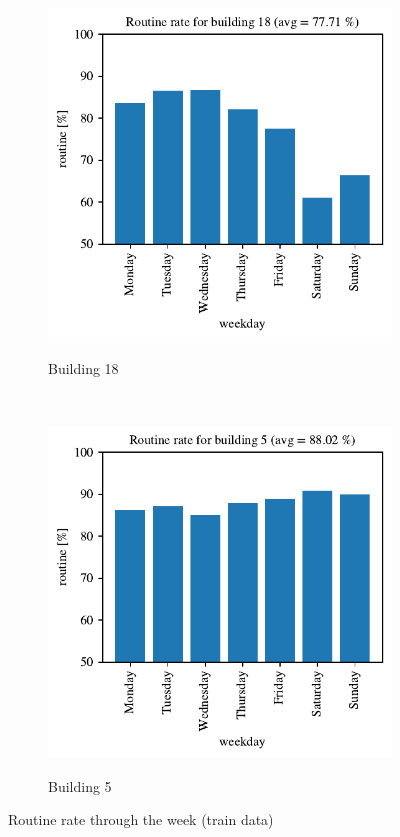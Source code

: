 \begin{figure}[H]
    \begin{subfigure}{.5\textwidth}
		\caption{Building 18}
		\includegraphics[width=1\linewidth]{../Figures/EC/b18week.pdf}
		\label{fig:ec_b18week}
	\end{subfigure}%
    ~ 
    \begin{subfigure}{.5\textwidth}
		\caption{Building 5}
		\includegraphics[width=1\linewidth]{../Figures/EC/b5week.pdf}
		\label{fig:ec_b5week}
	\end{subfigure}%
	\caption{Routine rate through the week (train data)}
    \label{fig:ec_week}
\end{figure}

